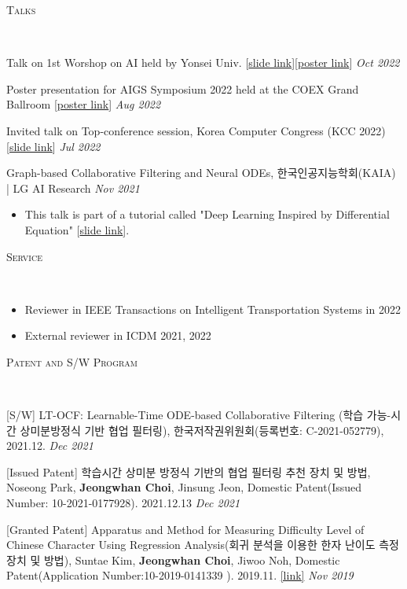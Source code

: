\documentclass[10pt]{article}
\newenvironment{changemargin}[2]{
  \begin{list}{}{
    \setlength{\topsep}{0pt}
    \setlength{\leftmargin}{#1}
    \setlength{\rightmargin}{#2}
    \setlength{\listparindent}{\parindent}
    \setlength{\itemindent}{\parindent}
    \setlength{\parsep}{\parskip}
  }
  \item[]}{\end{list}
}
\newcommand{\lineover}{
	\begin{changemargin}{-0.05in}{-0.05in}
		\vspace*{-8pt}
		\hrulefill \\
		\vspace*{-2pt}
	\end{changemargin}
}
\newcommand{\header}[1]{
	\begin{changemargin}{-0.5in}{-0.5in}
		\scshape{#1}\\
  	\lineover
	\end{changemargin}
}
\newcommand{\presentation}[2]{
	{#1} \hfill \emph{#2}\\ \bigskip
}
\newcommand{\award}[2]{
	{#1} \hfill \emph{#2}\\ \medskip
}
\newenvironment{body} {
	\vspace*{-16pt}
	\begin{changemargin}{-0.25in}{-0.5in}
  }
	{\end{changemargin}
}
\begin{document}
\medskip

\header{Talks}

\begin{body}
	\vspace{14pt}
\award{Talk on 1st Worshop on AI held by Yonsei Univ. [\href{https://www.dropbox.com/s/9au5xx13qa2l529/AAAI22_workshop.pdf?dl=0}{slide link}][\href{https://www.dropbox.com/s/pibzd51d76zy907/AAAI22-Yonsei_AI_Workshop.pdf?dl=0}{poster link}]}{Oct 2022}
\award{Poster presentation for AIGS Symposium 2022 held at the COEX Grand Ballroom [\href{https://www.dropbox.com/s/gfjsizak9s4cn9o/AAAI22-AIGS.pdf?dl=0}{poster link}]}{Aug 2022}
\award{Invited talk on Top-conference session,  Korea Computer Congress (KCC 2022) [\href{https://www.dropbox.com/s/22d9d92ns8uv9qw/AAAI22_KCC22.pdf?dl=0}{slide link}]}{Jul 2022}
\award{Graph-based Collaborative Filtering and Neural ODEs, 한국인공지능학회(KAIA) | LG AI Research}{Nov 2021}
	\begin{itemize} \itemsep -0pt  %
		\item This talk is part of a tutorial called "Deep Learning Inspired by Differential Equation" [\href{https://www.dropbox.com/s/1xn8xhd6llmhblz/%5BKAIA2021%5DTutorial-LT-OCF.pdf?dl=0}{slide link}].
  	\end{itemize}
\end{body}

\medskip

\header{Service}

\begin{body}
	\vspace{14pt}
    \begin{itemize}
        \item Reviewer in IEEE Transactions on Intelligent Transportation Systems in 2022
        \item External reviewer in ICDM 2021, 2022
    \end{itemize}
\end{body}

\medskip


\header{Patent and S/W Program}

\begin{body}
	\vspace{14pt}
	
\presentation{[S/W] LT-OCF: Learnable-Time ODE-based Collaborative Filtering (학습 가능-시간 상미분방정식 기반 협업 필터링), 한국저작권위원회(등록번호: C-2021-052779), 2021.12.}{Dec 2021}	
\presentation{[Issued Patent] 학습시간 상미분 방정식 기반의 협업 필터링 추천 장치 및 방법, Noseong Park, \textbf{Jeongwhan Choi}, Jinsung Jeon, Domestic Patent(Issued Number: 10-2021-0177928). 2021.12.13}{Dec 2021}	
\presentation{[Granted Patent] Apparatus and Method for Measuring Difficulty Level of Chinese Character Using Regression Analysis(회귀 분석을 이용한 한자 난이도 측정 장치 및 방법), Suntae Kim, \textbf{Jeongwhan Choi}, Jiwoo Noh, Domestic Patent(Application Number:10-2019-0141339 ). 2019.11. \href{https://doi.org/10.8080/1020190141339}{[link]}}{Nov 2019}	
  
\end{body}
    
\end{document}

